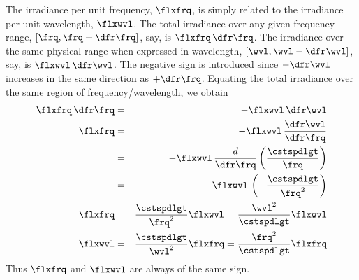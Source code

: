 \documentclass[12pt]{article}
\begin{document}
The irradiance per unit frequency, $\flxfrq$, is simply related to the
irradiance per unit wavelength, $\flxwvl$.
The total irradiance over any given frequency range, 
$[\frq,\frq+\dfr\frq]$, say, is $\flxfrq \,\dfr\frq$.
The irradiance over the same physical range when expressed in
wavelength, $[\wvl,\wvl-\dfr\wvl]$, say, is $\flxwvl \,\dfr\wvl$.
The negative sign is introduced since $-\dfr\wvl$ increases in the same
direction as $+\dfr\frq$.
Equating the total irradiance over the same region of
frequency/wavelength, we obtain
\begin{eqnarray}
\flxfrq \,\dfr\frq & = & - \flxwvl \,\dfr\wvl \nonumber \\
\flxfrq & = & - \flxwvl \, \frac{\dfr\wvl}{\dfr\frq} \nonumber \\
& = & - \flxwvl \, \frac{d}{\dfr\frq} \left( \frac{\cstspdlgt}{\frq} \right) \nonumber \\
& = & - \flxwvl \, \left( - \frac{\cstspdlgt}{\frq^{2}} \right) \nonumber \\
\flxfrq & = & \frac{\cstspdlgt}{\frq^{2}} \flxwvl =
\frac{\wvl^{2}}{\cstspdlgt} \flxwvl \\
\label{eqn:flx_frq_wvl}
\flxwvl & = & \frac{\cstspdlgt}{\wvl^{2}} \flxfrq =
\frac{\frq^{2}}{\cstspdlgt} \flxfrq 
\label{eqn:flx_wvl_frq}
\end{eqnarray}
Thus $\flxfrq$ and $\flxwvl$ are always of the same sign.
\end{document}
